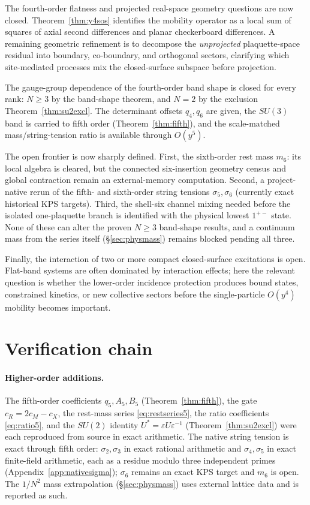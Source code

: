 \documentclass[11pt]{article}
\begin{document}
The fourth-order flatness and projected real-space geometry questions are now
closed. Theorem~\ref{thm:y4sos} identifies the mobility operator as a local
sum of squares of axial second differences and planar checkerboard
differences. A remaining geometric refinement is to decompose the
\emph{unprojected} plaquette-space residual into boundary, co-boundary, and
orthogonal sectors, clarifying which site-mediated processes mix the
closed-surface subspace before projection.

The gauge-group dependence of the fourth-order band shape is closed for every
rank: $N\geq3$ by the band-shape theorem, and $N=2$ by the exclusion
Theorem~\ref{thm:su2excl}. The determinant offsets $q_4,q_6$ are given, the $SU(3)$
band is carried to fifth order (Theorem~\ref{thm:fifth}), and the scale-matched
mass/string-tension ratio is available through $O(y^5)$.

The open frontier is now sharply defined. First, the sixth-order rest mass $m_6$:
its local algebra is cleared, but the connected six-insertion geometry census and
global contraction remain an external-memory computation. Second, a project-native
rerun of the fifth- and sixth-order string tensions $\sigma_5,\sigma_6$ (currently
exact historical KPS targets). Third, the shell-six channel mixing needed before the
isolated one-plaquette branch is identified with the physical lowest $1^{+-}$ state.
None of these can alter the proven $N\geq3$ band-shape results, and a continuum mass
from the series itself (\S\ref{sec:physmass}) remains blocked pending all three.

Finally, the interaction of two or more compact closed-surface excitations is
open. Flat-band systems are often dominated by interaction effects; here the
relevant question is whether the lower-order incidence protection produces
bound states, constrained kinetics, or new collective sectors before the
single-particle $O(y^4)$ mobility becomes important.

\appendix
\section{Verification chain}
\label{app:verification}

\paragraph{Higher-order additions.} The fifth-order coefficients $q_5,A_5,B_5$ (Theorem~\ref{thm:fifth}), the gate $c_R=2c_M-c_X$, the rest-mass series \eqref{eq:restseries5}, the ratio coefficients \eqref{eq:ratio5}, and the $SU(2)$ identity $U^*=\varepsilon U\varepsilon^{-1}$ (Theorem~\ref{thm:su2excl}) were each reproduced from source in exact arithmetic. The native string tension is exact through fifth order: $\sigma_2,\sigma_3$ in exact rational arithmetic and $\sigma_4,\sigma_5$ in exact finite-field arithmetic, each as a residue modulo three independent primes (Appendix~\ref{app:nativesigma}); $\sigma_6$ remains an exact KPS target and $m_6$ is open. The $1/N^2$ mass extrapolation (\S\ref{sec:physmass}) uses external lattice data and is reported as such.
\end{document}
